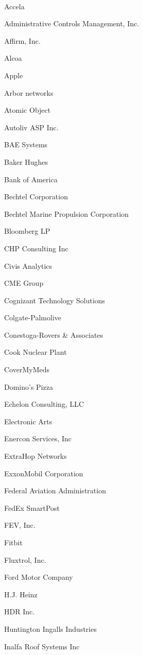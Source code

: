 \documentclass[twoside]{article}
\begin{document}
\begin{center}
\begin{multicols}{5}
        ~\hrulefill~
        \vspace{-.9em}
        \begin{FlushLeft}
        \begin{compactitem}
        \item Accela
\item Administrative Controls Management, Inc.
\item Affirm, Inc.
\item Alcoa
\item Apple
\item Arbor networks
\item Atomic Object
\item Autoliv ASP Inc.
\item BAE Systems
\item Baker Hughes
\item Bank of America
\item Bechtel Corporation
\item Bechtel Marine Propulsion Corporation
\item Bloomberg LP
\item CHP Consulting Inc
\item Civis Analytics
\item CME Group
\item Cognizant Technology Solutions
\item Colgate-Palmolive
\item Conestoga-Rovers \& Associates
\item Cook Nuclear Plant
\item CoverMyMeds
\item Domino's Pizza
\item Echelon Consulting, LLC
\item Electronic Arts
\item Enercon Services, Inc
\item ExtraHop Networks
\item ExxonMobil Corporation
\item Federal Aviation Administration
\item FedEx SmartPost
\item FEV, Inc.
\item Fitbit
\item Fluxtrol, Inc.
\item Ford Motor Company
\item H.J. Heinz
\item HDR Inc.
\item Huntington Ingalls Industries
\item Inalfa Roof Systems Inc

\end{compactitem}
\end{FlushLeft}
\end{multicols}
\end{center}
\end{document}
